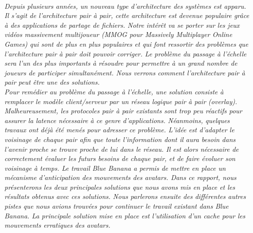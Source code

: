 \\
	\par \textit{Depuis plusieurs années, un nouveau type d'architecture des systèmes est apparu. Il s'agit de l'architecture pair à pair, cette architecture est devenue populaire grâce à des applications de partage de fichiers. Notre intérêt va se porter sur les jeux vidéos massivement multijoueur (MMOG pour Massively Multiplayer Online Games) qui sont de plus en plus populaires et qui font ressortir des problèmes que l'architecture pair à pair doit pouvoir corriger. Le problème du passage à l'échelle sera l'un des plus importants à résoudre pour permettre à un grand nombre de joueurs de participer simultanément. Nous verrons comment l'architecture pair à pair peut être une des solutions.\\ 
	 Pour remédier au problème du passage à l'échelle, une solution consiste à remplacer le modèle client/serveur par un réseau logique pair à pair (overlay). Malheureusement, les protocoles pair à pair existants sont trop peu réactifs pour assurer la latence nécessaire à ce genre d’applications. Néanmoins, quelques travaux ont déjà été menés pour adresser ce problème. L’idée est d’adapter le voisinage de chaque pair afin que toute l’information dont il aura besoin dans l'avenir proche se trouve proche de lui dans le réseau. Il est alors nécessaire de correctement évaluer les futurs besoins de chaque pair, et de faire évoluer son voisinage à temps. Le travail Blue Banana a permis de mettre en place un mécanisme d'anticipation des mouvements des avatars. Dans ce rapport, nous présenterons les deux principales solutions que nous avons mis en place et les résultats obtenus avec ces solutions. Nous parlerons ensuite des différentes autres pistes que nous avions trouvées pour continuer le travail existant dans Blue Banana. La principale solution mise en place est l'utilisation d'un cache pour les mouvements erratiques des avatars.}\\
